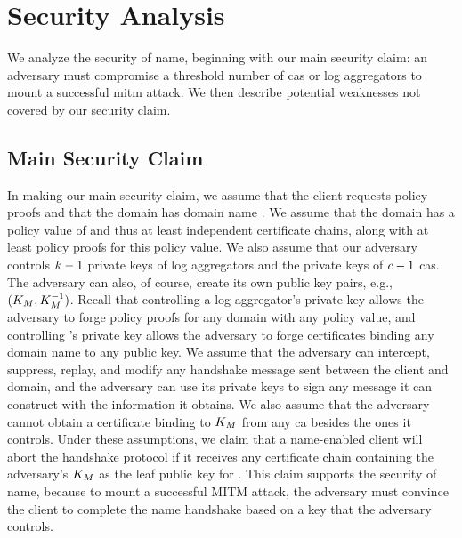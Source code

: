\section{Security Analysis}
\label{sec:analysis}

We analyze the security of \ac{name}, beginning with
our main security claim: an adversary must compromise a threshold number
of \acp{ca} or log aggregators to mount a successful \ac{mitm} attack.
We then describe potential weaknesses not covered by our security claim.

\subsection{Main Security Claim}
\label{sec:analysis:informal}

In making our main security claim, we assume that the client requests \numlas
policy proofs and that the domain has domain name \domain. We assume that
the domain has a policy value of \policy and thus at least \policy independent
certificate chains, along with at least \numlas policy proofs for this policy
value. We also assume that our adversary controls $k - 1$ private keys of
log aggregators and the private keys of $c - 1$ \acp{ca}. The adversary
can also, of course, create its own public key pairs, e.g., $(K_M,
K_M^{-1})$. Recall that controlling a log aggregator's private key
allows the adversary to forge policy proofs for any domain with any policy
value, and controlling 's private key allows the adversary to forge
certificates binding any domain name to any public key.  We assume that the
adversary can intercept, suppress, replay, and modify any handshake message sent
between the client and domain, and the adversary can use its private keys to sign any message
it can construct with the information it obtains. We also assume that the
adversary cannot obtain a certificate binding \domain to $K_M$ from
any \ac{ca} besides the ones it controls. Under these assumptions, we claim that
a \ac{name}-enabled client will abort the handshake protocol if it receives any
certificate chain containing the adversary's $K_M$ as the leaf public
key for \domain. This claim supports the security of \ac{name}, because to mount a successful
MITM attack, the adversary must convince the client to complete the \ac{name}
handshake based on a key that the adversary controls.

